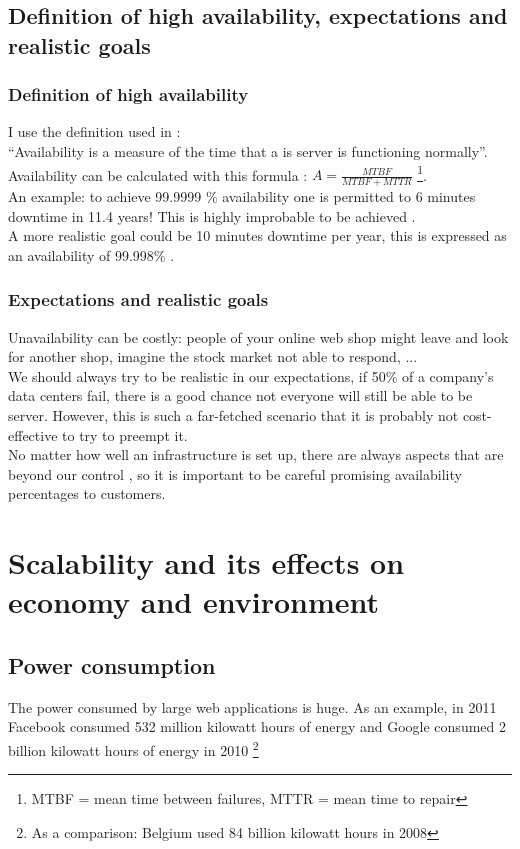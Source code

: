 \documentclass[12pt]{report}
\begin{document}
\section{Definition of high availability, expectations and realistic
  goals}
\subsection{Definition of high availability}
I use the definition used in \cite{ha_book}:\\
``Availability is a measure of the time that a is server is functioning
normally''.\\
Availability can be calculated with this formula \cite{ha_book}:
$A=\frac{MTBF}{MTBF +
  MTTR}$ \footnote{MTBF = mean time between failures, MTTR = mean time to repair}.\\
An example: to achieve 99.9999 \% availability one is permitted to 6
minutes downtime in 11.4 years! This is highly improbable to be
achieved \cite{ha_book}.\\
A more realistic goal could be 10 minutes downtime per year, this is
expressed as an availability of 99.998\% \cite{ha_book}.

\subsection{Expectations and realistic goals}
Unavailability can be costly: people of your online web shop
might leave and look for another shop, imagine the stock market not
able to respond, ...\\
We should always try to be realistic in our expectations, if 50\%
of a company's data centers fail, there is a good chance not everyone
will still be able to be server. However, this is such a far-fetched
scenario that it is probably not cost-effective to try to preempt
it.\\
No matter how well an infrastructure is set up, there are always
aspects that are beyond our control \cite{black_swan}, so it is
important to be careful promising availability percentages to
customers. 

\chapter{Scalability and its effects on economy and environment}
\section{Power consumption}
The power consumed by large web applications is huge. As an
example, in 2011 Facebook consumed 532 million kilowatt hours of
energy and Google consumed 2 billion kilowatt hours of
energy in 2010 \cite{datacenter_power} \footnote{As a comparison:
  Belgium used 84 billion kilowatt hours in 2008}
\end{document}
